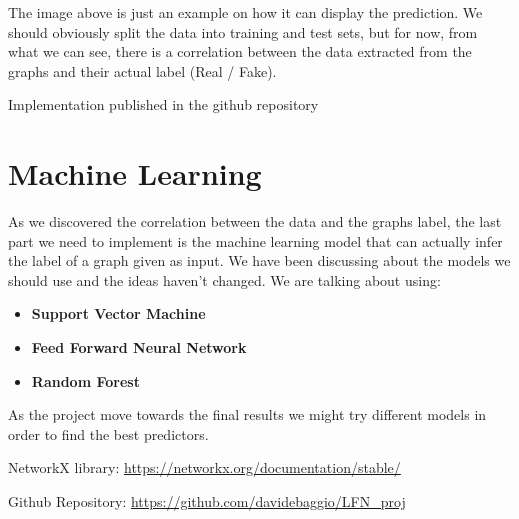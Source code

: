 \documentclass[11pt,a4paper]{article}
\begin{document}
The image above is just an example on how it can display the prediction. We should obviously split the data into training and test sets, but for now, from what we can see, there is a correlation between the data extracted from the graphs and their actual label (Real / Fake).

Implementation published in the github repository\cite{github}

\section*{Machine Learning}

As we discovered the correlation between the data and the graphs label, the last part we need to implement is the machine learning model that can actually infer the label of a graph given as input. We have been discussing about the models we should use and the ideas haven't changed.
We are talking about using:
\begin{itemize}
	\setlength\itemsep{-0.3em}
	\item \textbf{Support Vector Machine}
	\item \textbf{Feed Forward Neural Network}
	\item \textbf{Random Forest}
\end{itemize}

As the project move towards the final results we might try different models in order to find the best predictors.

\newpage

\begin{thebibliography}{9}
	 NetworkX library: \url{https://networkx.org/documentation/stable/}

	 Github Repository: \url{https://github.com/davidebaggio/LFN_proj}
\end{thebibliography}
\end{document}
